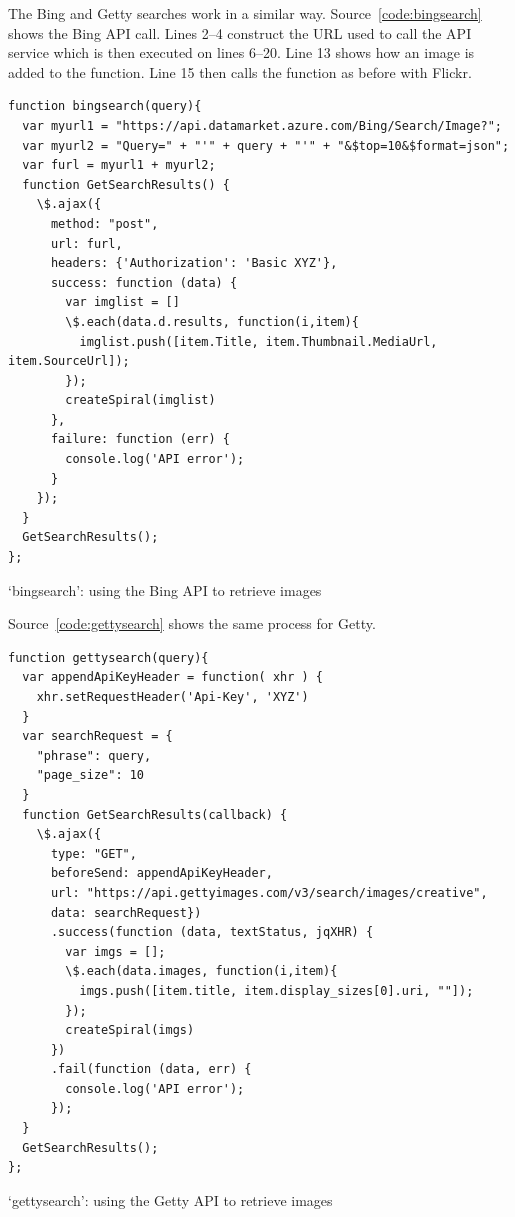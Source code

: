 The Bing and Getty searches work in a similar way. Source~\ref{code:bingsearch} shows the Bing \ac{API} call. Lines 2--4 construct the \ac{URL} used to call the \ac{API} service which is then executed on lines 6--20. Line 13 shows how an image is added to the  function. Line 15 then calls the  function as before with Flickr.

\begin{listing}
  \begin{verbatim}
function bingsearch(query){
  var myurl1 = "https://api.datamarket.azure.com/Bing/Search/Image?";
  var myurl2 = "Query=" + "'" + query + "'" + "&$top=10&$format=json";
  var furl = myurl1 + myurl2;
  function GetSearchResults() {
    \$.ajax({
      method: "post",
      url: furl,
      headers: {'Authorization': 'Basic XYZ'},
      success: function (data) {
        var imglist = []
        \$.each(data.d.results, function(i,item){
          imglist.push([item.Title, item.Thumbnail.MediaUrl, item.SourceUrl]);
        });
        createSpiral(imglist)
      },
      failure: function (err) {
        console.log('API error');
      }
    });
  }
  GetSearchResults();
};
  \end{verbatim}
\caption[`bingsearch' function]{`bingsearch': using the Bing API to retrieve images}
\label{code:bingsearch}
\end{listing}

Source~\ref{code:gettysearch} shows the same process for Getty.

\begin{listing}
  \begin{verbatim}
function gettysearch(query){
  var appendApiKeyHeader = function( xhr ) {
    xhr.setRequestHeader('Api-Key', 'XYZ')
  }
  var searchRequest = {
    "phrase": query,
    "page_size": 10
  }
  function GetSearchResults(callback) {
    \$.ajax({
      type: "GET",
      beforeSend: appendApiKeyHeader,
      url: "https://api.gettyimages.com/v3/search/images/creative",
      data: searchRequest})
      .success(function (data, textStatus, jqXHR) {
        var imgs = [];
        \$.each(data.images, function(i,item){
          imgs.push([item.title, item.display_sizes[0].uri, ""]);
        });
        createSpiral(imgs)
      })
      .fail(function (data, err) {
        console.log('API error');
      });
  }
  GetSearchResults();
};
  \end{verbatim}
\caption[`gettysearch' function]{`gettysearch': using the Getty API to retrieve images}
\label{code:gettysearch}
\end{listing}



